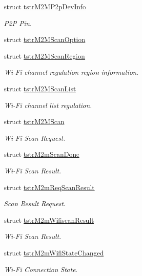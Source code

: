 \begin{DoxyCompactItemize}
struct \hyperlink{structtstrM2MP2pDevInfo}{tstr\+M2\+M\+P2p\+Dev\+Info}
\begin{DoxyCompactList}\small\item\em P2P Pin. \end{DoxyCompactList}\item 
struct \hyperlink{structtstrM2MScanOption}{tstr\+M2\+M\+Scan\+Option}
\item 
struct \hyperlink{structtstrM2MScanRegion}{tstr\+M2\+M\+Scan\+Region}
\begin{DoxyCompactList}\small\item\em Wi-\/\+Fi channel regulation region information. \end{DoxyCompactList}\item 
struct \hyperlink{structtstrM2MScanList}{tstr\+M2\+M\+Scan\+List}
\begin{DoxyCompactList}\small\item\em Wi-\/\+Fi channel list regulation. \end{DoxyCompactList}\item 
struct \hyperlink{structtstrM2MScan}{tstr\+M2\+M\+Scan}
\begin{DoxyCompactList}\small\item\em Wi-\/\+Fi Scan Request. \end{DoxyCompactList}\item 
struct \hyperlink{structtstrM2mScanDone}{tstr\+M2m\+Scan\+Done}
\begin{DoxyCompactList}\small\item\em Wi-\/\+Fi Scan Result. \end{DoxyCompactList}\item 
struct \hyperlink{structtstrM2mReqScanResult}{tstr\+M2m\+Req\+Scan\+Result}
\begin{DoxyCompactList}\small\item\em Scan Result Request. \end{DoxyCompactList}\item 
struct \hyperlink{structtstrM2mWifiscanResult}{tstr\+M2m\+Wifiscan\+Result}
\begin{DoxyCompactList}\small\item\em Wi-\/\+Fi Scan Result. \end{DoxyCompactList}\item 
struct \hyperlink{structtstrM2mWifiStateChanged}{tstr\+M2m\+Wifi\+State\+Changed}
\begin{DoxyCompactList}\small\item\em Wi-\/\+Fi Connection State. \end{DoxyCompactList}\item 

\end{DoxyCompactItemize}
